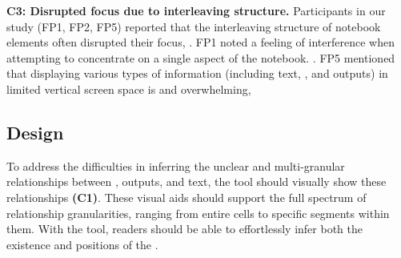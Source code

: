 \textbf{C3: Disrupted focus due to interleaving structure.}
Participants in our study (FP1, FP2, FP5) reported that the interleaving structure of notebook elements often disrupted their focus, .
FP1 noted a feeling of interference when attempting to concentrate on a single aspect of the notebook. 
.
FP5 mentioned that displaying various types of information (including text, , and outputs) in limited vertical screen space is  and overwhelming, 





\subsection{Design }


To address the difficulties in inferring the unclear and multi-granular relationships between , outputs, and text, the tool should visually show these relationships \textbf{(C1)}.
These visual aids should support the full spectrum of relationship granularities, ranging from entire cells to specific segments within them.
With the tool, readers should be able to effortlessly infer both the existence and positions of the .


